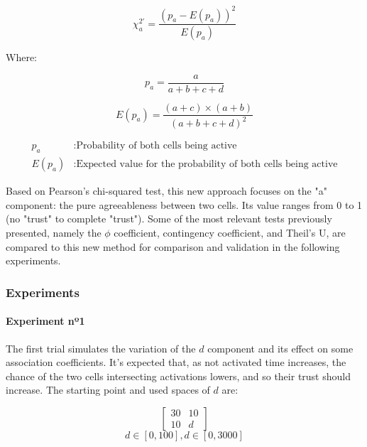 \begin{equation} \label{eq:cdmchi}
    \chi_a^{2'} = \frac{(p_a - E(p_a))^2}{E(p_a)}
\end{equation}

Where:

\[
    p_a = \frac{a}{a+b+c+d}
\]

\[
    E(p_a) = \frac{(a + c) \times (a + b)}{(a+b+c+d)^2}
\]

\begin{align*}
    p_a &: \text{Probability of both cells being active} \\
    E(p_a) &: \text{Expected value for the probability of both cells being active}
\end{align*}

Based on Pearson's chi-squared test, this new approach focuses on the "a" component: the pure agreeableness between two cells. Its value ranges from 0 to 1 (no "trust" to complete "trust"). Some of the most relevant tests previously presented, namely the $\phi$ coefficient, contingency coefficient, and Theil's U, are compared to this new method for comparison and validation in the following experiments.

\subsubsection{Experiments}

\paragraph{Experiment nº1}

The first trial simulates the variation of the $d$ component and its effect on some association coefficients. It's expected that, as not activated time increases, the chance of the two cells intersecting activations lowers, and so their trust should increase. The starting point and used spaces of $d$ are:

$$
\begin{bmatrix}
    30 & 10 \\ 10 & d
\end{bmatrix}
$$
$$
d \in [0, 100], d \in [0, 3000]
$$


